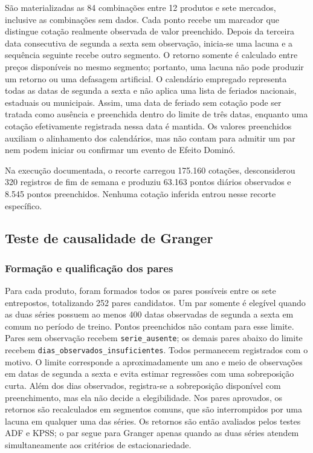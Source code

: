 \documentclass[12pt,a4paper]{article}
\begin{document}
São materializadas as 84 combinações entre 12 produtos e sete mercados,
inclusive as combinações sem dados. Cada ponto recebe um marcador que distingue
cotação realmente observada de valor preenchido. Depois da terceira data
consecutiva de segunda a sexta sem observação, inicia-se uma lacuna e a
sequência seguinte recebe outro segmento. O retorno somente é calculado entre
preços disponíveis no mesmo segmento; portanto, uma lacuna não pode produzir
um retorno ou uma defasagem artificial. O calendário empregado representa
todas as datas de segunda a sexta e não aplica uma lista de feriados nacionais,
estaduais ou municipais.
Assim, uma data de feriado sem cotação pode ser tratada como ausência e
preenchida dentro do limite de três datas, enquanto uma cotação efetivamente
registrada nessa data é mantida. Os valores preenchidos auxiliam o alinhamento
dos calendários, mas não contam para admitir um par nem podem iniciar ou
confirmar um evento de Efeito Dominó.

Na execução documentada, o recorte carregou 175.160 cotações, desconsiderou 320
registros de fim de semana e produziu 63.163 pontos diários observados e 8.545
pontos preenchidos. Nenhuma cotação inferida entrou nesse recorte específico.


\subsection{Teste de causalidade de Granger}

\subsubsection{Formação e qualificação dos pares}

Para cada produto, foram formados todos os pares possíveis entre os sete
entrepostos, totalizando 252 pares candidatos. Um par somente é elegível quando
as duas séries possuem ao menos 400 datas observadas de segunda a sexta em
comum no período de treino. Pontos preenchidos não contam para esse limite. Pares sem observação
recebem \texttt{serie\_ausente}; os demais pares abaixo do limite recebem
\texttt{dias\_observados\_insuficientes}. Todos permanecem registrados com o
motivo. O limite corresponde a aproximadamente um ano e meio de observações em
datas de segunda a sexta e evita estimar regressões com uma sobreposição curta.
Além dos dias observados,
registra-se a sobreposição disponível com
preenchimento, mas ela não decide a elegibilidade. Nos pares aprovados, os
retornos são recalculados em segmentos comuns, que são interrompidos por uma
lacuna em qualquer uma das séries. Os retornos são então avaliados pelos testes
ADF e KPSS; o par segue para Granger apenas quando as duas séries atendem
simultaneamente aos critérios de estacionariedade.
\end{document}
